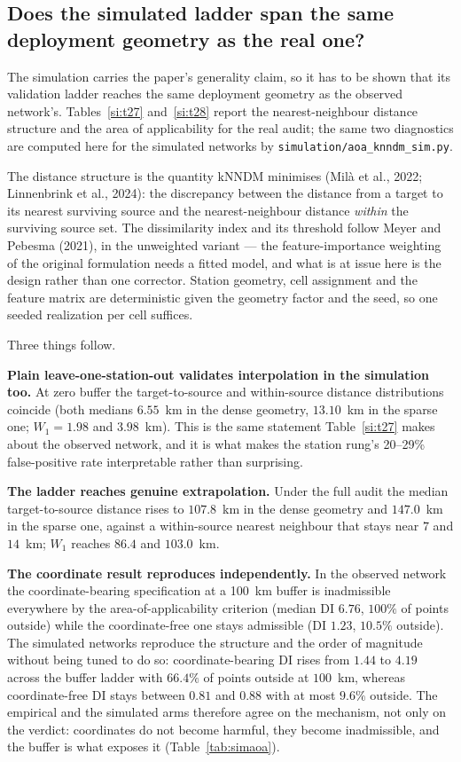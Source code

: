 \documentclass[11pt]{article}
\begin{document}
\subsection*{Does the simulated ladder span the same deployment geometry as the real one?}
The simulation carries the paper's generality claim, so it has to be shown that its validation
ladder reaches the same deployment geometry as the observed network's. Tables~\ref{si:t27} and~\ref{si:t28} report the
nearest-neighbour distance structure and the area of applicability for the real audit; the same two
diagnostics are computed here for the simulated networks by
\texttt{simulation/aoa\_knndm\_sim.py}.

The distance structure is the quantity kNNDM minimises (Mil\`a et al., 2022; Linnenbrink et al., 2024): the discrepancy
between the distance from a target to its nearest surviving source and the nearest-neighbour distance
\emph{within} the surviving source set. The dissimilarity index and its threshold follow
Meyer and Pebesma (2021), in the unweighted variant --- the feature-importance weighting of the original
formulation needs a fitted model, and what is at issue here is the design rather than one corrector.
Station geometry, cell assignment and the feature matrix are deterministic given the geometry factor
and the seed, so one seeded realization per cell suffices.

Three things follow.

\textbf{Plain leave-one-station-out validates interpolation in the simulation too.} At zero buffer
the target-to-source and within-source distance distributions coincide (both medians $6.55$~km in the
dense geometry, $13.10$~km in the sparse one; $W_1 = 1.98$ and $3.98$~km). This is the same statement
Table~\ref{si:t27} makes about the observed network, and it is what makes the station rung's 20--29\%
false-positive rate interpretable rather than surprising.

\textbf{The ladder reaches genuine extrapolation.} Under the full audit the median target-to-source
distance rises to $107.8$~km in the dense geometry and $147.0$~km in the sparse one, against a
within-source nearest neighbour that stays near $7$ and $14$~km; $W_1$ reaches $86.4$ and
$103.0$~km.

\textbf{The coordinate result reproduces independently.} In the observed network the
coordinate-bearing specification at a 100~km buffer is inadmissible everywhere by the
area-of-applicability criterion (median DI $6.76$, $100\%$ of points outside) while the
coordinate-free one stays admissible (DI $1.23$, $10.5\%$ outside). The simulated networks reproduce
the structure and the order of magnitude without being tuned to do so: coordinate-bearing DI rises
from $1.44$ to $4.19$ across the buffer ladder with $66.4\%$ of points outside at $100$~km, whereas
coordinate-free DI stays between $0.81$ and $0.88$ with at most $9.6\%$ outside. The empirical and
the simulated arms therefore agree on the mechanism, not only on the verdict: coordinates do not
become harmful, they become inadmissible, and the buffer is what exposes it
(Table~\ref{tab:simaoa}).
\end{document}
